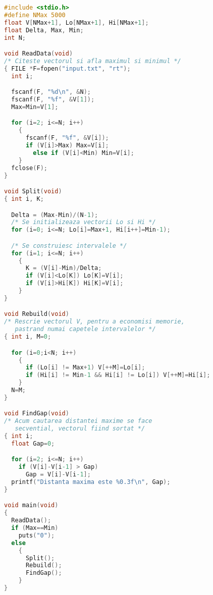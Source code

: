 \begin{lstlisting}[language=C]
#include <stdio.h>
#define NMax 5000
float V[NMax+1], Lo[NMax+1], Hi[NMax+1];
float Delta, Max, Min;
int N;

void ReadData(void)
/* Citeste vectorul si afla maximul si minimul */
{ FILE *F=fopen("input.txt", "rt");
  int i;

  fscanf(F, "%d\n", &N);
  fscanf(F, "%f", &V[1]);
  Max=Min=V[1];

  for (i=2; i<=N; i++)
    {
      fscanf(F, "%f", &V[i]);
      if (V[i]>Max) Max=V[i];
        else if (V[i]<Min) Min=V[i];
    }
  fclose(F);
}

void Split(void)
{ int i, K;

  Delta = (Max-Min)/(N-1);
  /* Se initializeaza vectorii Lo si Hi */
  for (i=0; i<=N; Lo[i]=Max+1, Hi[i++]=Min-1);

  /* Se construiesc intervalele */
  for (i=1; i<=N; i++)
    {
      K = (V[i]-Min)/Delta;
      if (V[i]<Lo[K]) Lo[K]=V[i];
      if (V[i]>Hi[K]) Hi[K]=V[i];
    }
}

void Rebuild(void)
/* Rescrie vectorul V, pentru a economisi memorie,
   pastrand numai capetele intervalelor */
{ int i, M=0;

  for (i=0;i<N; i++)
    {
      if (Lo[i] != Max+1) V[++M]=Lo[i];
      if (Hi[i] != Min-1 && Hi[i] != Lo[i]) V[++M]=Hi[i];
    }
  N=M;
}

void FindGap(void)
/* Acum cautarea distantei maxime se face
   secvential, vectorul fiind sortat */
{ int i;
  float Gap=0;

  for (i=2; i<=N; i++)
    if (V[i]-V[i-1] > Gap)
      Gap = V[i]-V[i-1];
  printf("Distanta maxima este %0.3f\n", Gap);
}

void main(void)
{
  ReadData();
  if (Max==Min)
    puts("0");
  else
    {
      Split();
      Rebuild();
      FindGap();
    }
}
\end{lstlisting}
